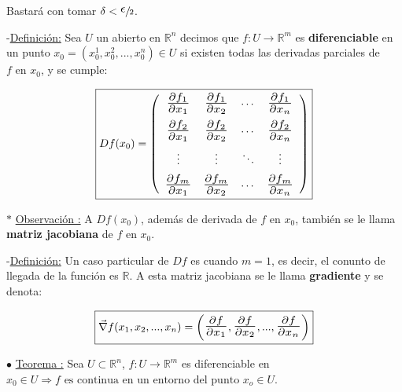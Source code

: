 \documentclass[10pt, titlepage]{article}
\newcommand{\R}{\mathbb{R}}
\newcommand{\bfrac}[2]{\scalebox{1.4}{$\frac{#1}{#2}$}}
\newcommand{\definicion}{\noindent-\underline{Definición:} }
\newcommand{\teorema}[1][\!\!]{\noindent$\bullet$ \underline{Teorema #1:} }
\newcommand{\observacion}[1][\!\!]{\noindent$\ast$ \underline{Observación #1:} }
\begin{document}
Bastará con tomar $\delta < \sfrac{\scalebox{1.5}{$\epsilon$}}{2}$.
\vspace{7mm}


\definicion Sea $U$ un abierto en $\R^n$ decimos que $f : U  \to \R^m$ es \textbf{diferenciable} en un 
punto $x_0 = (x_0^1, x_0^2,..., x_0^n) \in U$ si existen todas las derivadas parciales de $f \text{ en } x_0$, 
y se cumple:
\vspace{3mm}

\[
\boxed{
Df(x_0) = 
\left ( \begin{array}{cccc}

\bfrac{\partial f_1}{\partial x_1} & \bfrac{\partial f_1}{\partial x_2} & \cdots & \bfrac{\partial f_1}{\partial 
x_n}\vspace{2mm}\\
\bfrac{\partial f_2}{\partial x_1} & \bfrac{\partial f_2}{\partial x_2} & \cdots & \bfrac{\partial f_2}{\partial 
x_n}\vspace{2mm}\\
\vdots & \vdots & \ddots & \vdots\vspace{2mm}\\
\bfrac{\partial f_m}{\partial x_1} & \bfrac{\partial f_m}{\partial x_2} & \cdots & \bfrac{\partial f_m}{\partial 
x_n}\\

\end{array} \right )
}
\]
\vspace{7mm}

\observacion A $Df (x_0)$, además de derivada de $f \text{ en } x_0$, también se le llama \textbf{matriz 
jacobiana} de $f \text{ en } x_0$.
\vspace{7mm}


\definicion Un caso particular de $Df$ es cuando $m = 1$, es decir, el conunto de llegada de la función es 
$\R$. A esta matriz jacobiana se le llama \textbf{gradiente} y se denota:
\vspace{2mm}

\[
\boxed{
\vec{\nabla} f (x_1, x_2,..., x_n) = \left ( \bfrac{\partial f}{\partial x_1}, \bfrac{\partial f}{\partial x_2},..., 
\bfrac{\partial f}{\partial x_n}\right )
}
\]
\vspace{5mm}


\teorema Sea $U \subset \R^n$, $f : U \to \R^m$ es diferenciable en $x_0 \in U \Rightarrow f \text{ es 
continua en un entorno del punto } x_o \in U$.
\vspace{3mm}
\end{document}

